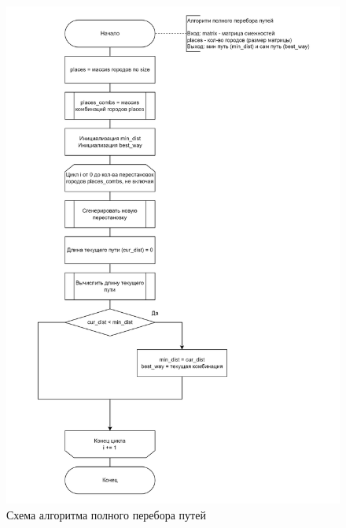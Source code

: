 \begin{figure}[h]
	\centering
	\includegraphics[height=0.8\textheight]{img/full-comb.png}
	\caption{Схема алгоритма полного перебора путей}
	\label{fig:full-comb}
\end{figure}

